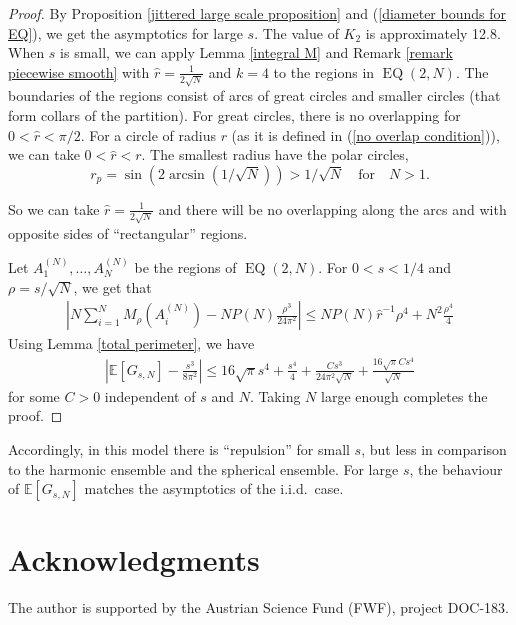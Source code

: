 \documentclass[a4paper,11pt]{amsart}
\begin{document}
\begin{proof}
By Proposition \ref{jittered large scale proposition} and (\ref{diameter bounds for EQ}), we get the asymptotics for large $s$. The value of $K_2$ is approximately 12.8. When $s$ is small, we can apply Lemma \ref{integral M} and Remark \ref{remark piecewise smooth} with $\hat{r}=\frac{1}{2\sqrt{N}}$ and $k=4$ to the regions in $\operatorname{EQ}(2,N)$. The boundaries of the regions consist of arcs of great circles and smaller circles (that form collars of the partition). For great circles, there is no overlapping for $0<\hat{r}<\pi/2$. For a circle of radius $r$ (as it is defined in (\ref{no overlap condition})), we can take $0<\hat{r}<r$. The smallest radius have the polar circles,
$$r_{p}=\sin\left(2\arcsin\left(1/\sqrt{N}\right)\right)>1/\sqrt{N}\quad \text{for} \quad N>1.$$

So we can take $\hat{r}=\frac{1}{2\sqrt{N}}$ and there will be no overlapping along the arcs and with opposite sides of ``rectangular'' regions.

Let $A_1^{(N)},\dots ,A_N^{(N)}$ be the regions of $\operatorname{EQ}(2,N)$. For $0<s<1/4$ and $\rho=s/\sqrt{N}$, we get that 
\begin{align*}
     \left|N\sum\limits_{i=1}^N M_{\rho}\left(A_i^{(N)}\right)-NP(N)\frac{\rho^3}{24\pi^2}\right|\leq NP(N)\hat{r}^{-1}\rho^4 +N^2\frac{\rho^4}4
\end{align*}
Using Lemma \ref{total perimeter}, we have
\begin{align*}
      \left|\mathbb{E}[G_{s,N}]-\frac{s^3}{8\pi^2}\right|\leq 16\sqrt{\pi}s^4+\frac{s^4}{4}+\frac{Cs^3}{24\pi^2\sqrt{N}}+\frac{16\sqrt{\pi}Cs^4}{\sqrt{N}}
\end{align*}
for some $C>0$ independent of $s$ and $N$. Taking $N$ large enough completes the proof.
\end{proof}
Accordingly, in this model there is ``repulsion'' for small $s$, but less in comparison to the harmonic ensemble and the spherical ensemble. For large $s$, the behaviour of $\mathbb{E}[G_{s,N}]$ matches the asymptotics of the i.i.d.\ case.


\section*{Acknowledgments}

The author is supported by the Austrian Science Fund (FWF), project DOC-183. 
%
%
\end{document}
